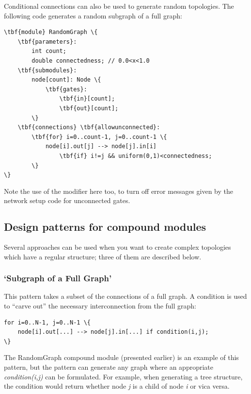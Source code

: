 Conditional connections can also be used to generate random
topologies.  The following code generates a
random subgraph of a full graph:

\begin{Verbatim}[commandchars=\\\{\}]
\tbf{module} RandomGraph \{
    \tbf{parameters}:
        int count;
        double connectedness; // 0.0<x<1.0
    \tbf{submodules}:
        node[count]: Node \{
            \tbf{gates}:
                \tbf{in}[count];
                \tbf{out}[count];
        \}
    \tbf{connections} \tbf{allowunconnected}:
        \tbf{for} i=0..count-1, j=0..count-1 \{
            node[i].out[j] --> node[j].in[i]
                \tbf{if} i!=j && uniform(0,1)<connectedness;
        \}
\}
\end{Verbatim}

Note the use of the  modifier
here too, to turn off error messages given by the network setup code
for unconnected gates.


\subsection{Design patterns for compound modules}


Several approaches can be used when you want to create complex
topologies which have a regular structure; three of them are
described below.


\subsubsection{`Subgraph of a Full Graph'}


This pattern takes a subset of the connections of a full graph.  A
condition is used to ``carve out'' the necessary interconnection from
the full graph:

\begin{Verbatim}[commandchars=\\\{\}]
for i=0..N-1, j=0..N-1 \{
    node[i].out[...] --> node[j].in[...] if condition(i,j);
\}
\end{Verbatim}

The RandomGraph compound module (presented earlier) is an example of
this pattern, but the pattern can generate any graph where an
appropriate \textit{condition(i,j)} can be formulated. For example,
when generating a tree structure, the condition
would return whether node \textit{j} is a child of node \textit{i} or
vica versa.

